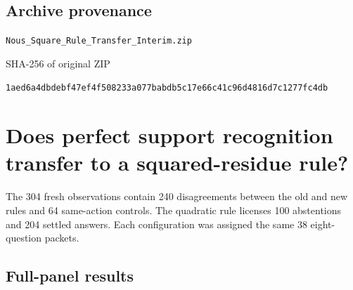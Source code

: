 \documentclass[11pt,letterpaper]{article}
\begin{document}
\subsection*{Archive provenance}

\nolinkurl{Nous_Square_Rule_Transfer_Interim.zip}\par

\small\sffamily SHA-256 of original ZIP\par\normalfont\small\nolinkurl{1aed6a4dbdebf47ef4f508233a077babdb5c17e66c41c96d4816d7c1277fc4db}\par

\clearpage\normalsize\tableofcontents\clearpage{}

\section*{Does perfect support recognition transfer to a squared-residue rule?}

The 304 fresh observations contain 240 disagreements between the old and new rules and 64 same-action controls. The quadratic rule licenses 100 abstentions and 204 settled answers. Each configuration was assigned the same 38 eight-question packets.


\subsection{Full-panel results}
\end{document}
